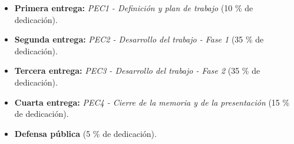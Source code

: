 \documentclass[IB,BIB]{TFUOC}%
\begin{document}
% 
% 
% 

\begin{itemize}
    \item \textbf{Primera entrega:} \textit{PEC1 - Definición y plan de trabajo} (10 \% de dedicación).
    \item \textbf{Segunda entrega:} \textit{PEC2 - Desarrollo del trabajo - Fase 1} (35 \% de dedicación).
    \item \textbf{Tercera entrega:} \textit{PEC3 - Desarrollo del trabajo - Fase 2} (35 \% de dedicación).
    \item \textbf{Cuarta entrega:} \textit{PEC4 - Cierre de la memoria y de la presentación} (15 \% de dedicación).
    \item \textbf{Defensa pública} (5 \% de dedicación).
\end{itemize}
\end{document}
